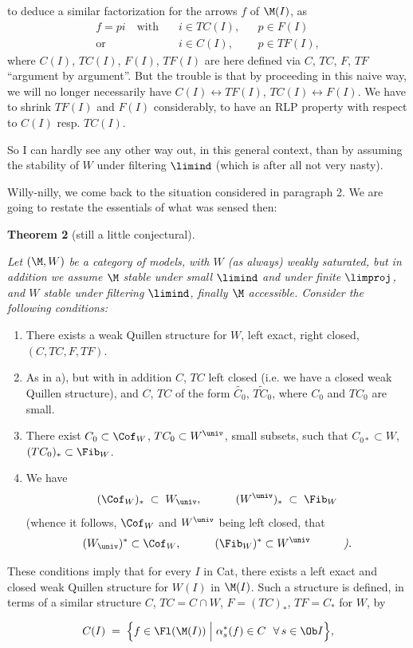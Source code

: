 to deduce a similar factorization for the arrows $f$ of $\M(I)$, as
\[
\begin{aligned}
f = pi \quad \text{with}\quad & i \in TC(I), && p \in F(I)\\
\text{or}\quad & i \in C(I), && p \in TF(I),
\end{aligned}
\]
where $C(I)$, $TC(I)$, $F(I)$, $TF(I)$ are here defined via $C$, $TC$, $F$, $TF$ ``argument by argument''. But the trouble is that by proceeding in this naive way, we will no longer necessarily have $C(I) \longleftrightarrow TF(I)$, $TC(I) \longleftrightarrow F(I)$. We have to shrink $TF(I)$ and $F(I)$ considerably, to have an RLP property with respect to $C(I)$ resp. $TC(I)$.

So I can hardly see any other way out, in this general context, than by assuming the stability of $W$ under filtering $\limind$ (which is after all not very nasty).

\noindent{}

Willy-nilly, we come back to the situation considered in paragraph 2. We are going to restate the essentials of what was sensed then:

\textbf{Theorem 2} (still a little conjectural). {\itshape Let $(\M,W)$ be a category of models, with $W$ (as always) weakly saturated, but in addition we assume $\M$ stable under small $\limind$ and under finite $\limproj$, and $W$ stable under filtering $\limind$, finally $\M$ accessible. Consider the following conditions:

\begin{enumerate}
\item[\textup{a)}] There exists a weak Quillen structure for $W$, left exact, right closed, $(C,TC,F,TF)$.
\item[\textup{a$'$)}] As in \textup{a)}, but with in addition $C$, $TC$ left closed (\textup{i.e.} we have a closed weak Quillen structure), and $C$, $TC$ of the form $\widetilde{C_0}$, $\widetilde{TC_0}$, where $C_0$ and $TC_0$ are small.
\item[\textup{a$''$)}] There exist $C_0 \subset \Cof_W$, $TC_0 \subset W^{\univ}$, small subsets, such that $C_{0*} \subset W$, $(TC_0)_* \subset \Fib_W$.
\item[\textup{b)}] We have
\[
(\Cof_W)_* \;\subset\; W_{\univ}, \qquad\quad (W^{\univ})_* \;\subset\; \Fib_W
\]
(whence it follows, $\Cof_W$ and $W^{\univ}$ being left closed, that
\[
(W_{\univ})^* \subset \Cof_W, \qquad\quad (\Fib_W)^* \subset W^{\univ} \qquad\quad \text{\itshape ).}
\]
\end{enumerate}

\noindent{}

These conditions imply that for every $I$ in \textup{Cat}, there exists a left exact and closed weak Quillen structure for $W(I)$ in $\M(I)$. Such a structure is defined, in terms of a similar structure $C$, $TC = C \cap W$, $F = (TC)_*$, $TF = C_*$ for $W$, by}
\[
C(I) \;=\; \Bigl\{ f \in \Fl(\M(I)) \Bigm| \alpha_s^*(f) \in C \ \ \forall\, s \in \Ob I \Bigr\},
\]

